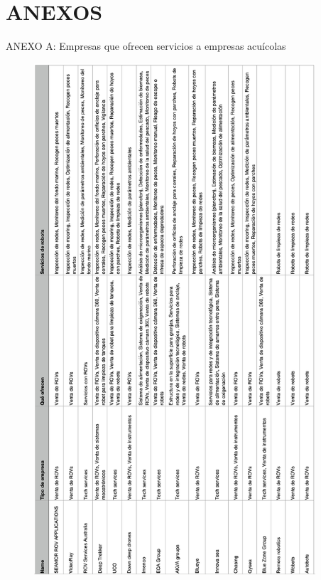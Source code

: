 \chapter*{\center \Large ANEXOS} 

\newpage
\begin{center}
    {ANEXO A: Empresas que ofrecen servicios a empresas acuícolas} \label{empresas}
\end{center}

\begin{figure}[h!]
    \begin{center}
    \includegraphics[height=19cm]{images/Empresas.png} 
    \end{center}
\end{figure}